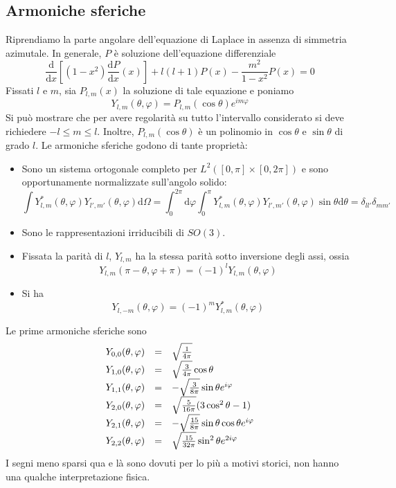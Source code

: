 \documentclass[a4paper,11pt]{book}
\newcommand{\dif}{\mathrm{d}}
\theoremstyle{theorem}
\theoremstyle{definition}
\begin{document}
\subsection{Armoniche sferiche}
Riprendiamo la parte angolare dell'equazione di Laplace in assenza di simmetria azimutale. In generale, $P$ è soluzione dell'equazione differenziale
\[\frac{\dif}{\dif x}\left[(1-x^2)\frac{\dif P}{\dif x}(x)\right]+l(l+1)P(x)-\frac{m^2}{1-x^2}P(x)=0\]
Fissati $l$ e $m$, sia $P_{l,m}(x)$ la soluzione di tale equazione e poniamo
\[Y_{l,m}(\theta,\varphi)=P_{l,m}(\cos\theta)e^{im\varphi}\]
Si può mostrare che per avere regolarità su tutto l'intervallo considerato si deve richiedere $-l\leq m\leq l$. Inoltre, $P_{l,m}(\cos\theta)$ è un polinomio in $\cos\theta$ e $\sin\theta$ di grado $l$. Le armoniche sferiche godono di tante proprietà:
\begin{itemize}
	\item Sono un sistema ortogonale completo per $L^2([0,\pi]\times[0,2\pi])$ e sono opportunamente normalizzate sull'angolo solido:
	\[\int Y^*_{l,m}(\theta,\varphi)Y_{l',m'}(\theta,\varphi)\dif\Omega=\int_{0}^{2\pi}\dif\varphi\int_{0}^{\pi}Y^*_{l,m}(\theta,\varphi)Y_{l',m'}(\theta,\varphi)\sin\theta\dif\theta=\delta_{ll'}\delta_{mm'}\]
	\item Sono le rappresentazioni irriducibili di $SO(3)$.
	\item Fissata la parità di $l$, $Y_{l,m}$ ha la stessa parità sotto inversione degli assi, ossia
	\[Y_{l,m}(\pi-\theta,\varphi+\pi)=(-1)^lY_{l,m}(\theta,\varphi)\] 
	\item Si ha
	\[Y_{l,-m}(\theta,\varphi)=(-1)^mY^*_{l,m}(\theta,\varphi)\]
\end{itemize}
Le prime armoniche sferiche sono
\[\begin{array}{l l l}
Y_{0,0}(\theta,\varphi)&=&\sqrt{\frac{1}{4\pi}}\\
Y_{1,0}(\theta,\varphi)&=&\sqrt{\frac{3}{4\pi}}\cos\theta\\
Y_{1,1}(\theta,\varphi)&=&-\sqrt{\frac{3}{8\pi}}\sin\theta e^{i\varphi}\\
Y_{2,0}(\theta,\varphi)&=&\sqrt{\frac{5}{16\pi}}(3\cos^2\theta-1)\\
Y_{2,1}(\theta,\varphi)&=&-\sqrt{\frac{15}{8\pi}}\sin\theta\cos\theta e^{i\varphi}\\
Y_{2,2}(\theta,\varphi)&=&\sqrt{\frac{15}{32\pi}}\sin^2\theta e^{2i\varphi}
\end{array}\]
I segni meno sparsi qua e là sono dovuti per lo più a motivi storici, non hanno una qualche interpretazione fisica.
\end{document}
